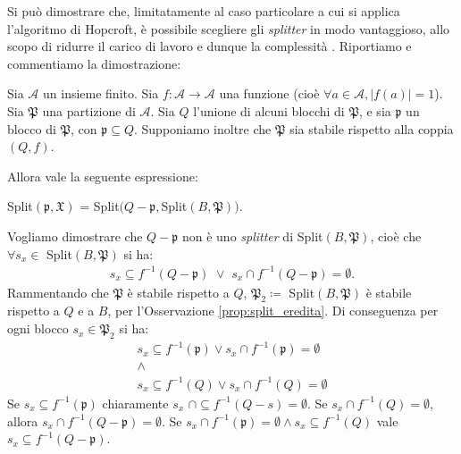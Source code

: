 Si può dimostrare che, limitatamente al caso particolare a cui si applica l'algoritmo di Hopcroft, è possibile scegliere gli \emph{splitter} in modo vantaggioso, allo scopo di ridurre il carico di lavoro e dunque la complessità \cite{hopcroft}. Riportiamo e commentiamo la dimostrazione:
\begin{proposition}
    \label{prop:process_smaller_half}
    Sia $\mathcal{A}$ un insieme finito. Sia $f : \mathcal{A} \to \mathcal{A}$ una funzione (cioè $\forall a \in \mathcal{A}, |f({a})| = 1$). Sia $\mathfrak{P}$ una partizione di $\mathcal{A}$. Sia $Q$ l'unione di alcuni blocchi di $\mathfrak{P}$, e sia $\mathfrak{p}$ un blocco di $\mathfrak{P}$, con $\mathfrak{p} \subseteq Q$. Supponiamo inoltre che $\mathfrak{P}$ sia stabile rispetto alla coppia $(Q, f)$.

    Allora vale la seguente espressione:
    \begin{center}
        Split$(\mathfrak{p},\mathfrak{X})$ = Split$(Q - \mathfrak{p}, $Split$(B,\mathfrak{P}))$.
    \end{center}
\end{proposition}
\begin{proof2}
    Vogliamo dimostrare che $Q - \mathfrak{p}$ non è uno \emph{splitter} di Split$(B,\mathfrak{P})$, cioè che $\forall s_x \in $ Split$(B,\mathfrak{P})$ si ha:
    \begin{gather*}
        s_x \subseteq f^{-1}(Q - \mathfrak{p}) \,\,\lor\,\, s_x \cap f^{-1}(Q - \mathfrak{p}) = \emptyset.
    \end{gather*}
    Rammentando che $\mathfrak{P}$ è stabile rispetto a $Q$, $\mathfrak{P}_2 \coloneqq$ Split$(B,\mathfrak{P})$ è stabile rispetto a $Q$ e a $B$, per l'Osservazione \ref{prop:split_eredita}. Di conseguenza per ogni blocco $s_x \in \mathfrak{P}_2$ si ha:
    \begin{gather*}
        s_x \subseteq f^{-1}(\mathfrak{p}) \lor s_x \cap f^{-1}(\mathfrak{p}) = \emptyset\\
        \land\\
        s_x \subseteq f^{-1}(Q) \lor s_x \cap f^{-1}(Q) = \emptyset
    \end{gather*}
    Se $s_x \subseteq f^{-1}(\mathfrak{p})$ chiaramente $s_x \,\,\cap \subseteq f^{-1}(Q-s) = \emptyset$. Se $s_x \cap f^{-1}(Q) = \emptyset$, allora $s_x \cap f^{-1}(Q - \mathfrak{p}) = \emptyset$. Se $s_x \cap f^{-1}(\mathfrak{p}) = \emptyset \land s_x \subseteq f^{-1}(Q)$ vale $s_x \subseteq f^{-1}(Q - \mathfrak{p})$.
\end{proof2}

